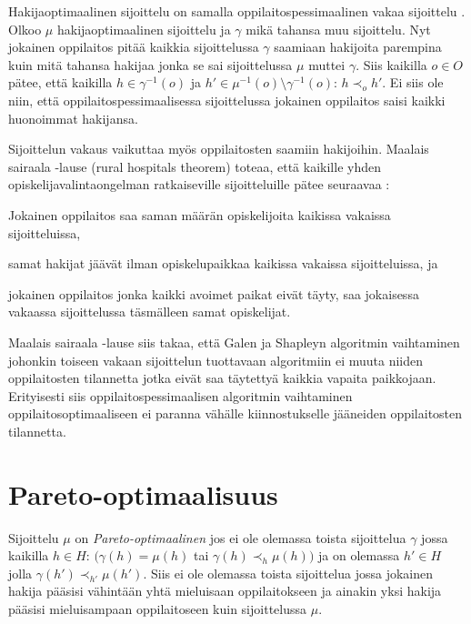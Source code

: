 \documentclass[gradu, twoside]{tktltiki}
\begin{document}
Hakijaoptimaalinen sijoittelu on samalla oppilaitospessimaalinen vakaa
sijoittelu \cite{gusfield89}. Olkoo $\mu$ hakijaoptimaalinen
sijoittelu ja $\gamma$ mikä tahansa muu sijoittelu. Nyt jokainen
oppilaitos pitää kaikkia sijoittelussa $\gamma$ saamiaan hakijoita
parempina kuin mitä tahansa hakijaa jonka se sai sijoittelussa $\mu$
muttei $\gamma$. Siis kaikilla $o \in O$ pätee, että kaikilla $h \in
\gamma^{-1}(o)$ ja $h' \in \mu^{-1}(o) \setminus \gamma^{-1}(o)$: $h
\prec_o h'$. Ei siis ole niin, että oppilaitospessimaalisessa
sijoittelussa jokainen oppilaitos saisi kaikki huonoimmat hakijansa.

Sijoittelun vakaus vaikuttaa myös oppilaitosten saamiin hakijoihin.
Maalais sairaala -lause (rural hospitals theorem) toteaa, että
kaikille yhden opiskelijavalintaongelman ratkaiseville sijoitteluille
pätee seuraavaa \cite{gusfield89}:
\begin{itemize*}
  \item Jokainen oppilaitos saa saman määrän opiskelijoita kaikissa
    vakaissa sijoitteluissa,
  \item samat hakijat jäävät ilman opiskelupaikkaa kaikissa vakaissa
    sijoitteluissa, ja
  \item jokainen oppilaitos jonka kaikki avoimet paikat eivät täyty,
    saa jokaisessa vakaassa sijoittelussa täsmälleen samat
    opiskelijat.
\end{itemize*}

Maalais sairaala -lause siis takaa, että Galen ja Shapleyn algoritmin
vaihtaminen johonkin toiseen vakaan sijoittelun tuottavaan algoritmiin
ei muuta niiden oppilaitosten tilannetta jotka eivät saa täytettyä
kaikkia vapaita paikkojaan. Erityisesti siis oppilaitospessimaalisen
algoritmin vaihtaminen oppilaitosoptimaaliseen ei paranna vähälle
kiinnostukselle jääneiden oppilaitosten tilannetta.

\section{Pareto-optimaalisuus}

Sijoittelu $\mu$ on \emph{Pareto-optimaalinen} jos ei ole olemassa
toista sijoittelua $\gamma$ jossa kaikilla $h \in H$: $(\gamma(h) =
\mu(h)$ tai $\gamma(h) \prec_h \mu(h))$ ja on olemassa $h' \in H$
jolla $\gamma(h') \prec_{h'} \mu(h')$. Siis ei ole olemassa toista
sijoittelua jossa jokainen hakija pääsisi vähintään yhtä mieluisaan
oppilaitokseen ja ainakin yksi hakija pääsisi mieluisampaan
oppilaitoseen kuin sijoittelussa $\mu$.
\end{document}
